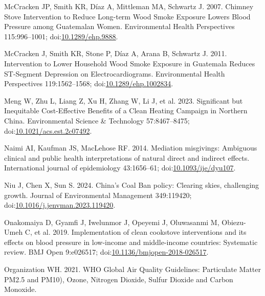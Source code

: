 \documentclass[
  letterpaper,
  DIV=11,
  numbers=noendperiod]{scrartcl}
\newlength{\cslhangindent}
\newlength{\cslentryspacingunit} %
\newenvironment{CSLReferences}[2] %
 {%
  \setlength{\parindent}{0pt}
  \ifodd #1
  \let\oldpar\par
  \def\par{\hangindent=\cslhangindent\oldpar}
  \fi
  \setlength{\parskip}{#2\cslentryspacingunit}
 }%
 {}
\begin{document}
\begin{CSLReferences}{1}{0}
\leavevmode{}%
McCracken JP, Smith KR, Díaz A, Mittleman MA, Schwartz J. 2007. Chimney
{Stove Intervention} to {Reduce Long-term Wood Smoke Exposure Lowers
Blood Pressure} among {Guatemalan Women}. Environmental Health
Perspectives 115:996--1001;
doi:\href{https://doi.org/10.1289/ehp.9888}{10.1289/ehp.9888}.

\leavevmode{}%
McCracken J, Smith KR, Stone P, Díaz A, Arana B, Schwartz J. 2011.
Intervention to {Lower Household Wood Smoke Exposure} in {Guatemala
Reduces ST-Segment Depression} on {Electrocardiograms}. Environmental
Health Perspectives 119:1562--1568;
doi:\href{https://doi.org/10.1289/ehp.1002834}{10.1289/ehp.1002834}.

\leavevmode{}%
Meng W, Zhu L, Liang Z, Xu H, Zhang W, Li J, et al. 2023. Significant
but {Inequitable Cost-Effective Benefits} of a {Clean Heating Campaign}
in {Northern China}. Environmental Science \& Technology 57:8467--8475;
doi:\href{https://doi.org/10.1021/acs.est.2c07492}{10.1021/acs.est.2c07492}.

\leavevmode{}%
Naimi AI, Kaufman JS, MacLehose RF. 2014. Mediation misgivings:
Ambiguous clinical and public health interpretations of natural direct
and indirect effects. International journal of epidemiology 43:1656--61;
doi:\href{https://doi.org/10.1093/ije/dyu107}{10.1093/ije/dyu107}.

\leavevmode{}%
Niu J, Chen X, Sun S. 2024. China's {Coal Ban} policy: {Clearing} skies,
challenging growth. Journal of Environmental Management 349:119420;
doi:\href{https://doi.org/10.1016/j.jenvman.2023.119420}{10.1016/j.jenvman.2023.119420}.

\leavevmode{}%
Onakomaiya D, Gyamfi J, Iwelunmor J, Opeyemi J, Oluwasanmi M,
Obiezu-Umeh C, et al. 2019. Implementation of clean cookstove
interventions and its effects on blood pressure in low-income and
middle-income countries: Systematic review. BMJ Open 9:e026517;
doi:\href{https://doi.org/10.1136/bmjopen-2018-026517}{10.1136/bmjopen-2018-026517}.

\leavevmode{}%
Organization WH. 2021. {WHO Global Air Quality Guidelines}: {Particulate
Matter PM2}.5 and {PM10}), {Ozone}, {Nitrogen Dioxide}, {Sulfur Dioxide}
and {Carbon Monoxide}.


\end{CSLReferences}
\end{document}
